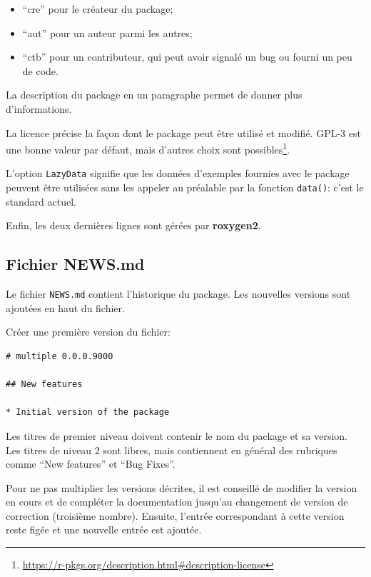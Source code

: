 \documentclass[
  12pt,
  french,
  a4paper,
  extrafontsizes,onecolumn,openright
  ]{memoir}
\providecommand{\tightlist}{%
  \setlength{\itemsep}{0pt}\setlength{\parskip}{0pt}}
\begin{document}
\begin{itemize}
\tightlist
\item
  \enquote{cre} pour le créateur du package;
\item
  \enquote{aut} pour un auteur parmi les autres;
\item
  \enquote{ctb} pour un contributeur, qui peut avoir signalé un bug ou fourni un peu de code.
\end{itemize}

La description du package en un paragraphe permet de donner plus d'informations.

La licence précise la façon dont le package peut être utilisé et modifié.
GPL-3 est une bonne valeur par défaut, mais d'autres choix sont possibles\footnote{\url{https://r-pkgs.org/description.html\#description-license}}.

L'option \texttt{LazyData} signifie que les données d'exemples fournies avec le package peuvent être utilisées sans les appeler au préalable par la fonction \texttt{data()}: c'est le standard actuel.

Enfin, les deux dernières lignes sont gérées par \textbf{roxygen2}.

\subsection{Fichier NEWS.md}\label{fichier-news.md}

Le fichier \texttt{NEWS.md} contient l'historique du package.
Les nouvelles versions sont ajoutées en haut du fichier.

Créer une première version du fichier:

\begin{verbatim}
# multiple 0.0.0.9000

## New features

* Initial version of the package
\end{verbatim}

Les titres de premier niveau doivent contenir le nom du package et sa version.
Les titres de niveau 2 sont libres, mais contiennent en général des rubriques comme \enquote{New features} et \enquote{Bug Fixes}.

Pour ne pas multiplier les versions décrites, il est conseillé de modifier la version en cours et de compléter la documentation jusqu'au changement de version de correction (troisième nombre).
Ensuite, l'entrée correspondant à cette version reste figée et une nouvelle entrée est ajoutée.
\end{document}
